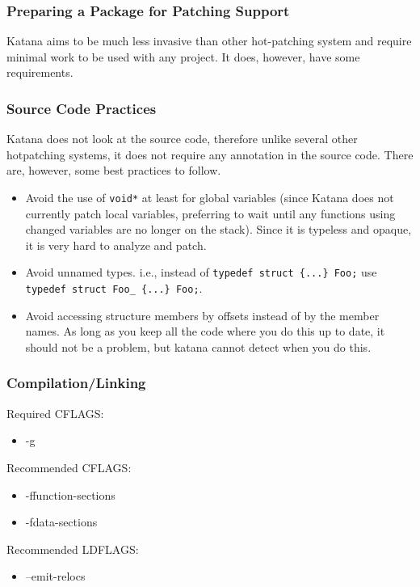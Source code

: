\documentclass[11pt]{article}
\begin{document}
\subsubsection{Preparing a Package for Patching Support}
\label{sec-3.5.1}

     Katana aims to be much less invasive than other hot-patching system
     and require minimal work to be used with any project. It does,
     however, have some requirements.\\
\subsubsection{Source Code Practices}
\label{sec-3.5.2}

    Katana does not look at the source code, therefore unlike several
    other hotpatching systems, it does not require any annotation in
    the source code. There are, however, some best practices to
    follow.
\begin{itemize}
\item Avoid the use of \texttt{void*} at least for global variables (since
      Katana does not currently patch local variables, preferring to
      wait until any functions using changed variables are no longer
      on the stack). Since it is typeless and opaque, it is very hard
      to analyze and patch.
\item Avoid unnamed types. i.e., instead of \texttt{typedef struct \{...\} Foo;}
      use \texttt{typedef struct Foo\_ \{...\} Foo;}.
\item Avoid accessing structure members by offsets instead of by the
      member names. As long as you keep all the code where you do this
      up to date, it should not be a problem, but katana cannot detect
      when you do this.
\end{itemize}
\subsubsection{Compilation/Linking}
\label{sec-3.5.3}

    Required CFLAGS:
\begin{itemize}
\item -g
\end{itemize}
    Recommended CFLAGS:
\begin{itemize}
\item -ffunction-sections
\item -fdata-sections
\end{itemize}
    Recommended LDFLAGS:
\begin{itemize}
\item --emit-relocs
\end{itemize}
\end{document}
